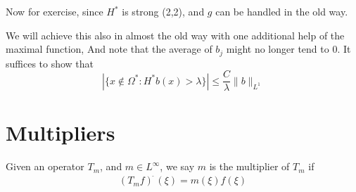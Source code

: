 Now for exercise, since $H^*$ is strong (2,2), and $g$ can be handled in the old way.
\begin{note}
    We will achieve this also in almost the old way with one additional help of the maximal function, And note that the average of $b_j$ might no longer tend to 0.
    It suffices to show that 
    \begin{equation*}
        |\{x\not\in\Omega^*: H^*b(x)>\lambda\}|\leq\frac{C}{\lambda}\|b\|_{L^1}
    \end{equation*}
\end{note}

\section{Multipliers}
\begin{definition}
    Given an operator $T_m$, and $m\in L^\infty$, we say $m$ is the multiplier of $T_m$ if
    \begin{equation*}
        (T_mf)^{\widehat{\phantom{.}}}(\xi)=m(\xi)\hat{f}(\xi)
    \end{equation*}
\end{definition}



